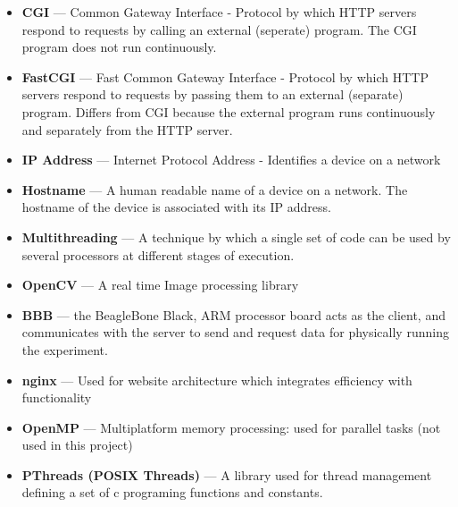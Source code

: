 \begin{itemize}
	\item {\bf CGI} --- Common Gateway Interface - Protocol by which HTTP servers respond to requests by calling an external (seperate) program. The CGI program does not run continuously.
	\item {\bf FastCGI} --- Fast Common Gateway Interface - Protocol by which HTTP servers respond to requests by passing them to an external (separate) program. Differs from CGI because the external program runs continuously and separately from the HTTP server.
	\item {\bf IP Address} --- Internet Protocol Address - Identifies a device on a network
	\item {\bf Hostname} --- A human readable name of a device on a network. The hostname of the device is associated with its IP address.
	\item {\bf Multithreading} --- A technique by which a single set of code can be used by several processors at different stages of execution.
	\item {\bf OpenCV} --- A real time Image processing library
	\item {\bf BBB} --- the BeagleBone Black, ARM processor board acts as the client, and communicates with the server to send and request data for physically running the experiment. 
	\item {\bf nginx} --- Used for website architecture which integrates efficiency with functionality
	\item {\bf OpenMP} --- Multiplatform memory processing: used for parallel tasks (not used in this project) 
	\item {\bf PThreads (POSIX Threads)} --- A library used for thread management defining a set of c programing functions and constants. 
\end{itemize}
